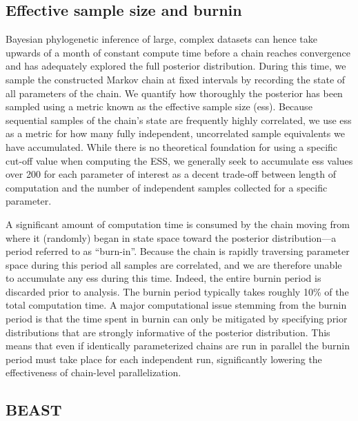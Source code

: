 \subsection{Effective sample size and burnin}
\label{sec:ess}

Bayesian phylogenetic inference of large, complex datasets can hence take upwards of a month of constant compute time before a chain reaches convergence and has adequately explored the full posterior distribution.
During this time, we sample the constructed Markov chain at fixed intervals by recording the state of all parameters of the chain.
We quantify how thoroughly the posterior has been sampled using a metric known as the effective sample size (\gls{ess}). %
Because sequential samples of the chain's state are frequently highly correlated, we use \gls{ess} as a metric for how many fully independent, uncorrelated sample equivalents we have accumulated.
While there is no theoretical foundation for using a specific cut-off value when computing the ESS, we generally seek to accumulate \gls{ess} values over 200 for each parameter of interest as a decent trade-off between length of computation and the number of independent samples collected for a specific parameter.

A significant amount of computation time is consumed by the chain moving from where it (randomly) began in state space toward the posterior distribution---a period referred to as ``burn-in''.
Because the chain is rapidly traversing parameter space during this period all samples are correlated, and we are therefore unable to accumulate any \gls{ess} during this time.
Indeed, the entire burnin period is discarded prior to analysis.
The burnin period typically takes roughly 10\% of the total computation time. %
A major computational issue stemming from the burnin period is that the time spent in burnin can only be mitigated by specifying prior distributions that are strongly informative of the posterior distribution.
This means that even if identically parameterized chains are run in parallel the burnin period must take place for each independent run, significantly lowering the effectiveness of chain-level parallelization.


\subsection{BEAST}

